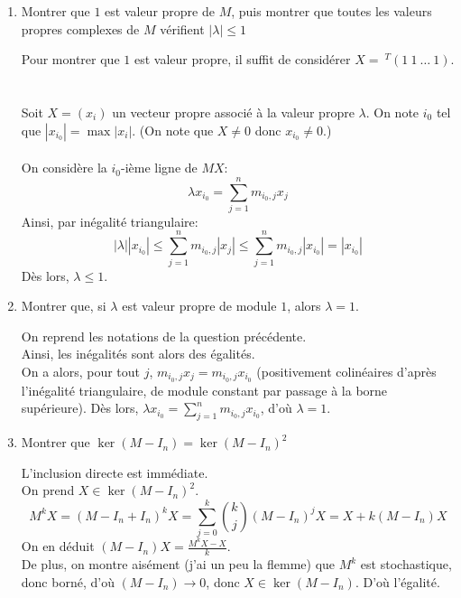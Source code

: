 \documentclass[a4paper,12pt]{article}
\begin{document}
	\begin{enumerate}
		\item Montrer que $ 1 $ est valeur propre de $ M $, puis montrer que toutes les valeurs propres complexes de $ M $ vérifient $ \left| \lambda \right| \leqslant 1 $ \\
		
		\begin{correctionbox}
			Pour montrer que $ 1 $ est valeur propre, il suffit de considérer $ X =\ ^T (1\ 1\ \dots \ 1) $. \\ \\ \\
			Soit $ X = (x_i) $ un vecteur propre associé à la valeur propre $ \lambda $. On note $ i_0 $ tel que $ \left| x_{i_0} \right| = \max \left| x_i \right| $. (On note que $ X \not = 0 $ donc $ x_{i_0} \not = 0 $.)
			\\ \\
			On considère la $ i_0 $-ième ligne de $ MX $:
			$$ \lambda x_{i_0} = \sum_{j=1}^{n} m_{i_0,j} x_j $$
			Ainsi, par inégalité triangulaire: $$ \left| \lambda \right| \left| x_{i_0} \right| \leqslant \sum_{j=1}^{n} m_{i_0,j} \left| x_j \right| \leqslant \sum_{j=1}^{n} m_{i_0,j} \left| x_{i_0} \right| = \left| x_{i_0} \right| $$
			Dès lors, $ \lambda \leqslant 1 $.
		\end{correctionbox}
		
		\item Montrer que, si $ \lambda $ est valeur propre de module $ 1 $, alors $ \lambda = 1 $.
		
		\begin{correctionbox}
			On reprend les notations de la question précédente. \\
			Ainsi, les inégalités sont alors des égalités. \\
			On a alors, pour tout $ j $,  $ m_{i_0, j} x_j = m_{i_0, j} x_{i_0} $ (positivement colinéaires d'après l'inégalité triangulaire, de module constant par passage à la borne supérieure).
			Dès lors, $ \lambda x_{i_0} = \sum_{j=1}^n m_{i_0,j} x_{i_0} $, d'où $ \lambda = 1 $.
		\end{correctionbox}
		
		\item Montrer que $ \ker (M-I_n) = \ker (M-I_n)^2 $
		\begin{correctionbox}
			L'inclusion directe est immédiate. \\
			On prend $ X \in \ker (M-I_n)^2 $. \\
			$$ M^kX = (M-I_n+I_n)^kX = \sum_{j=0}^{k} \binom{k}{j} (M-I_n)^jX = X+k(M-I_n)X $$
			On en déduit $ (M-I_n)X = \frac{M^kX - X}{k} $. \\
			De plus, on montre aisément (j'ai un peu la flemme) que $M^k$ est stochastique, donc borné, d'où $(M-I_n) \xrightarrow{}{} 0 $, donc $ X \in \ker (M-I_n) $. D'où l'égalité.
		\end{correctionbox}		
		
		
	\end{enumerate}
\end{document}
